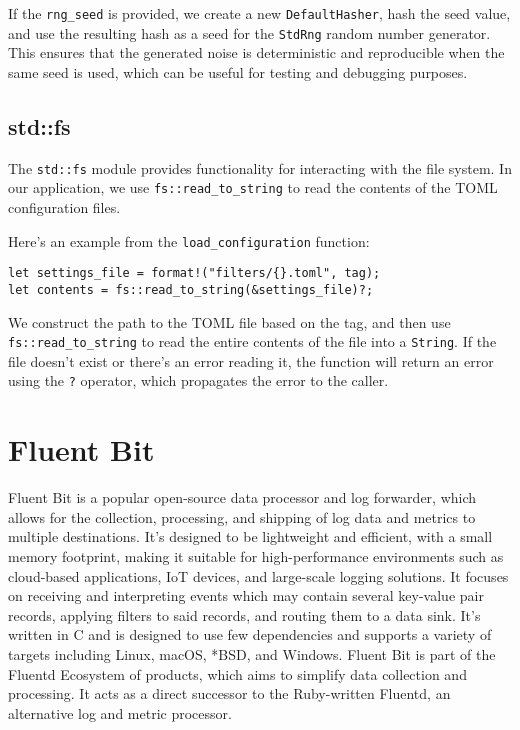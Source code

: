 If the \texttt{rng\_seed} is provided, we create a new \texttt{DefaultHasher}, hash the seed value, and use the resulting hash as a seed for the \texttt{StdRng} random number generator. This ensures that the generated noise is deterministic and reproducible when the same seed is used, which can be useful for testing and debugging purposes.

\subsection{std::fs}
The \texttt{std::fs} module provides functionality for interacting with the file system. In our application, we use \texttt{fs::read\_to\_string} to read the contents of the TOML configuration files.

Here's an example from the \texttt{load\_configuration} function:

\begin{verbatim}
let settings_file = format!("filters/{}.toml", tag);
let contents = fs::read_to_string(&settings_file)?;
\end{verbatim}

We construct the path to the TOML file based on the tag, and then use \texttt{fs::read\_to\_string} to read the entire contents of the file into a \texttt{String}. If the file doesn't exist or there's an error reading it, the function will return an error using the \texttt{?} operator, which propagates the error to the caller.

\section{Fluent Bit}
Fluent Bit is a popular open-source data processor and log forwarder, which allows for the collection, processing, and shipping of log data and metrics to multiple destinations. It's designed to be lightweight and efficient, with a small memory footprint, making it suitable for high-performance environments such as cloud-based applications, IoT devices, and large-scale logging solutions. It focuses on receiving and interpreting events which may contain several key-value pair records, applying filters to said records, and routing them to a data sink. It's written in C and is designed to use few dependencies and supports a variety of targets including Linux, macOS, *BSD, and Windows. Fluent Bit is part of the Fluentd Ecosystem of products, which aims to simplify data collection and processing. It acts as a direct successor to the Ruby-written Fluentd, an alternative log and metric processor.

